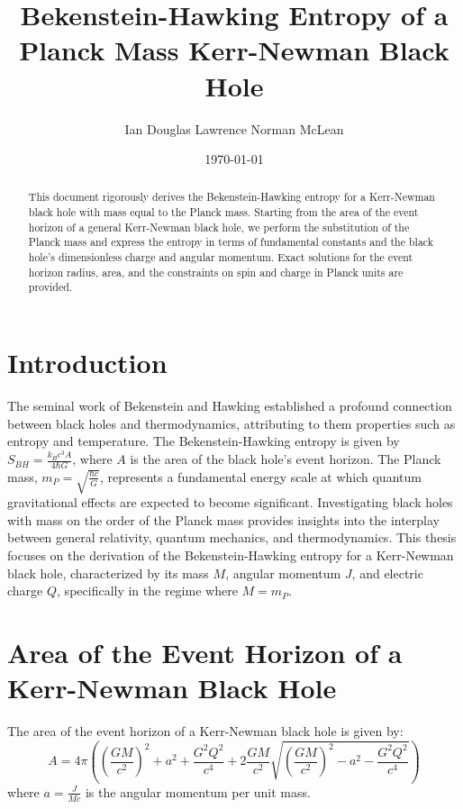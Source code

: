 \documentclass{article}
\title{Bekenstein-Hawking Entropy of a Planck Mass Kerr-Newman Black Hole}
\author{Ian Douglas Lawrence Norman McLean}
\date{\today}
\begin{document}
	
	\maketitle
	
	\begin{abstract}
		This document rigorously derives the Bekenstein-Hawking entropy for a Kerr-Newman black hole with mass equal to the Planck mass. Starting from the area of the event horizon of a general Kerr-Newman black hole, we perform the substitution of the Planck mass and express the entropy in terms of fundamental constants and the black hole's dimensionless charge and angular momentum. Exact solutions for the event horizon radius, area, and the constraints on spin and charge in Planck units are provided.
	\end{abstract}
	
	\section{Introduction}
	
	The seminal work of Bekenstein and Hawking established a profound connection between black holes and thermodynamics, attributing to them properties such as entropy and temperature. The Bekenstein-Hawking entropy is given by $S_{BH} = \frac{k_B c^3 A}{4 \hbar G}$, where $A$ is the area of the black hole's event horizon. The Planck mass, $m_P = \sqrt{\frac{\hbar c}{G}}$, represents a fundamental energy scale at which quantum gravitational effects are expected to become significant. Investigating black holes with mass on the order of the Planck mass provides insights into the interplay between general relativity, quantum mechanics, and thermodynamics. This thesis focuses on the derivation of the Bekenstein-Hawking entropy for a Kerr-Newman black hole, characterized by its mass $M$, angular momentum $J$, and electric charge $Q$, specifically in the regime where $M = m_P$.
	
	\section{Area of the Event Horizon of a Kerr-Newman Black Hole}
	
	The area of the event horizon of a Kerr-Newman black hole is given by:
	$$A = 4 \pi \left( \left(\frac{G M}{c^2}\right)^2 + a^2 + \frac{G^2 Q^2}{c^4} + 2 \frac{G M}{c^2} \sqrt{\left(\frac{G M}{c^2}\right)^2 - a^2 - \frac{G^2 Q^2}{c^4}} \right)$$
	where $a = \frac{J}{M c}$ is the angular momentum per unit mass.
	
\end{document}
